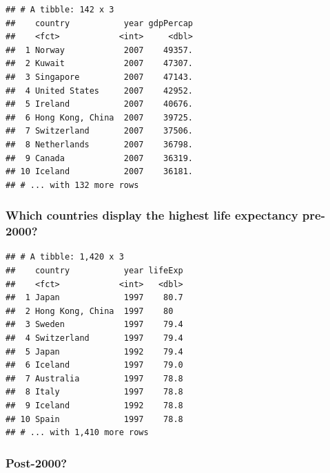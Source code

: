 \documentclass[12pt,]{article}
\newenvironment{Shaded}{\begin{snugshade}}{\end{snugshade}}
\newcommand{\KeywordTok}[1]{\textcolor[rgb]{0.13,0.29,0.53}{\textbf{#1}}}
\newcommand{\DecValTok}[1]{\textcolor[rgb]{0.00,0.00,0.81}{#1}}
\newcommand{\StringTok}[1]{\textcolor[rgb]{0.31,0.60,0.02}{#1}}
\newcommand{\OperatorTok}[1]{\textcolor[rgb]{0.81,0.36,0.00}{\textbf{#1}}}
\newcommand{\NormalTok}[1]{#1}
\begin{document}
\begin{verbatim}
## # A tibble: 142 x 3
##    country           year gdpPercap
##    <fct>            <int>     <dbl>
##  1 Norway            2007    49357.
##  2 Kuwait            2007    47307.
##  3 Singapore         2007    47143.
##  4 United States     2007    42952.
##  5 Ireland           2007    40676.
##  6 Hong Kong, China  2007    39725.
##  7 Switzerland       2007    37506.
##  8 Netherlands       2007    36798.
##  9 Canada            2007    36319.
## 10 Iceland           2007    36181.
## # ... with 132 more rows
\end{verbatim}

\subsubsection{Which countries display the highest life expectancy
pre-2000?}\label{which-countries-display-the-highest-life-expectancy-pre-2000}

\begin{Shaded}
\end{Shaded}

\begin{verbatim}
## # A tibble: 1,420 x 3
##    country           year lifeExp
##    <fct>            <int>   <dbl>
##  1 Japan             1997    80.7
##  2 Hong Kong, China  1997    80  
##  3 Sweden            1997    79.4
##  4 Switzerland       1997    79.4
##  5 Japan             1992    79.4
##  6 Iceland           1997    79.0
##  7 Australia         1997    78.8
##  8 Italy             1997    78.8
##  9 Iceland           1992    78.8
## 10 Spain             1997    78.8
## # ... with 1,410 more rows
\end{verbatim}

\subsubsection{Post-2000?}\label{post-2000}
\end{document}
